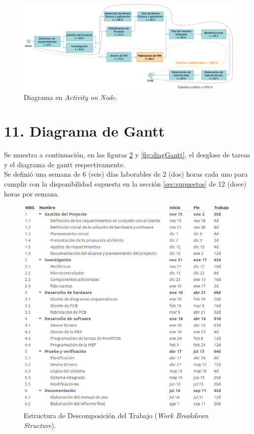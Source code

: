 \documentclass[
11pt, %
]{charter}
\begin{document}
\begin{figure}[htpb]
\centering 
\includegraphics[width=1\textwidth]{./Figuras/Activity On Node.png}
\caption{Diagrama en \textit{Activity on Node}.}
\label{fig:AoN}
\end{figure}

\vspace{25px}



\section{11. Diagrama de Gantt}
\label{sec:gantt}

Se muestra a continuación, en las figuras \ref{fig:WBS_Planner} y \ref{fig:diagGantt}, el desglose de tareas y el diagrama de gantt respectivamente.\\
Se definió una semana de 6 (seis) días laborables de 2 (dos) horas cada uno para cumplir con la disponibilidad supuesta en la sección \ref{sec:supuestos} de 12 (doce) horas por semana.

\vspace{25px}

\begin{figure}[htpb]
\centering 
\includegraphics[width=.8\textwidth]{./Figuras/WBS.png}
\caption{Estructura de Descomposición del Trabajo (\textit{Work Breakdown Structure}).}
\label{fig:WBS_Planner}
\end{figure}
\end{document}
